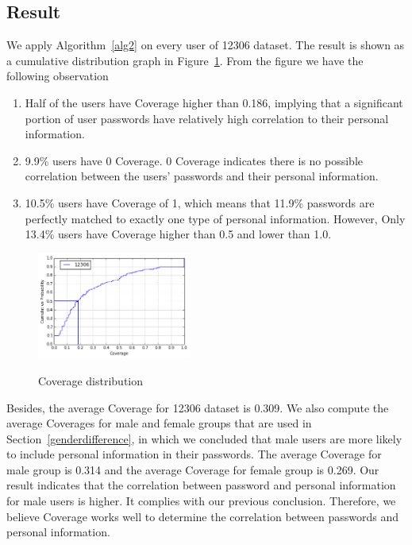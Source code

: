 \documentclass{sig-alternate}
\begin{document}
\subsection{Result}
We apply Algorithm~\ref{alg2} on every user of 12306 dataset. The result is shown as a cumulative distribution graph in Figure~\ref{f2}. From the figure we have the following observation
\begin{enumerate}[leftmargin=*]
\item Half of the users have Coverage higher than 0.186, implying that  a significant portion of user passwords have relatively high correlation to their personal information.
\item 9.9\% users have 0 Coverage. 0 Coverage indicates there is no possible correlation between the users' passwords and their personal information.
\item 10.5\% users have Coverage of 1, which means that 11.9\% passwords are perfectly matched to exactly one type of personal information. However, Only 13.4\% users have Coverage higher than 0.5 and lower than 1.0. 
\end{enumerate}

\begin{figure}[h!]
\centering
  \caption{Coverage distribution}{}
  \label{f2}
  \centering
    \includegraphics[width=0.45\textwidth]{fig/cvghist}
\end{figure}

Besides, the average Coverage for 12306 dataset is 0.309. We also compute the average Coverages for male and female groups that are used in Section~\ref{genderdifference}, in which we concluded that male users are more likely to include personal information in their passwords. The average Coverage for male group is 0.314 and the average Coverage for female group is 0.269. Our result indicates that the correlation between password and personal information for male users is higher. It complies with our previous conclusion. Therefore, we believe Coverage works well to determine the correlation between passwords and personal information.
\end{document}
